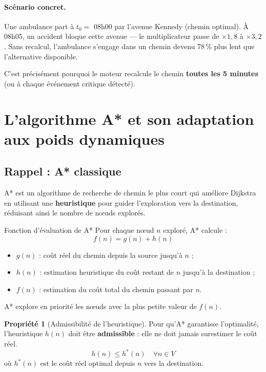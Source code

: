 \documentclass[12pt,a4paper]{article}
\theoremstyle{definition}
\newtheorem{propriete}{Propriété}[section]
\theoremstyle{remark}
\begin{document}
\paragraph{Scénario concret.}
Une ambulance part à $t_0 =$ 08h00 par l'avenue Kennedy (chemin optimal).
À 08h05, un accident bloque cette avenue — le multiplicateur passe de
$\times 1{,}8$ à $\times 3{,}2$. Sans recalcul, l'ambulance s'engage
dans un chemin devenu 78\,\% plus lent que l'alternative disponible.

\bigskip
\noindent C'est précisément pourquoi le moteur recalcule le chemin \textbf{toutes
les 5 minutes} (ou à chaque événement critique détecté).

\newpage

\section{L'algorithme A* et son adaptation aux poids dynamiques}

\subsection{Rappel : A* classique}

A* est un algorithme de recherche de chemin le plus court qui améliore
Dijkstra en utilisant une \textbf{heuristique} pour guider l'exploration
vers la destination, réduisant ainsi le nombre de nœuds explorés.

\begin{defbox}{Fonction d'évaluation de A*}
Pour chaque nœud $n$ exploré, A* calcule :
$$
f(n) = g(n) + h(n)
$$
\begin{itemize}
  \item $g(n)$ : coût réel du chemin depuis la source jusqu'à $n$ ;
  \item $h(n)$ : estimation heuristique du coût restant de $n$ jusqu'à
        la destination ;
  \item $f(n)$ : estimation du coût total du chemin passant par $n$.
\end{itemize}
A* explore en priorité les nœuds avec la plus petite valeur de $f(n)$.
\end{defbox}

\begin{propriete}[Admissibilité de l'heuristique]
  Pour qu'A* garantisse l'optimalité, l'heuristique $h(n)$ doit être
  \textbf{admissible} : elle ne doit jamais surestimer le coût réel.
  $$
  h(n) \leq h^*(n) \quad \forall n \in V
  $$
  où $h^*(n)$ est le coût réel optimal depuis $n$ vers la destination.
\end{propriete}
\end{document}
